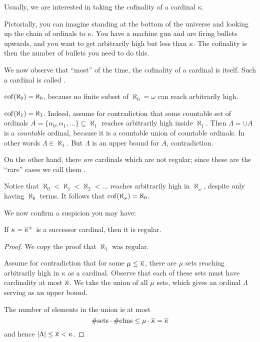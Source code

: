 Usually, we are interested in taking the cofinality of a cardinal $\kappa$.

Pictorially, you can imagine standing at the bottom of the universe and looking
up the chain of ordinals to $\kappa$.
You have a machine gun and are firing bullets upwards, and you want to get arbitrarily
high but less than $\kappa$.
The cofinality is then the number of bullets you need to do this.

We now observe that ``most'' of the time, the cofinality of a cardinal is itself.
Such a cardinal is called .
\begin{example}
	$\operatorname{cof}(\aleph_0) = \aleph_0$, because no finite subset of
	$\aleph_ 0 = \omega$ can reach arbitrarily high.
\end{example}
\begin{example}
	$\operatorname{cof}(\aleph_1) = \aleph_1$.
	Indeed, assume for contradiction that some countable
	set of ordinals $A = \{ \alpha_0, \alpha_1, \dots \} \subseteq \aleph_1$
	reaches arbitrarily high inside $\aleph_1$.
	Then $\Lambda = \cup A$ is a \emph{countable} ordinal,
	because it is a countable union of countable ordinals.
	In other words $\Lambda \in \aleph_1$.
	But $\Lambda$ is an upper bound for $A$, contradiction.
\end{example}
On the other hand, there \emph{are} cardinals which are not regular;
since these are the ``rare'' cases we call them .
\begin{example}
	Notice that $\aleph_0 < \aleph_1 < \aleph_2 < \dots$ reaches
	arbitrarily high in $\aleph_\omega$, despite only having $\aleph_0$ terms.
	It follows that $\operatorname{cof}(\aleph_\omega) = \aleph_0$.
\end{example}

We now confirm a suspicion you may have:
\begin{theorem}
	If $\kappa = \overline\kappa^+$ is a successor cardinal,
	then it is regular.
\end{theorem}
\begin{proof}
	We copy the proof that $\aleph_1$ was regular.

	Assume for contradiction that for some $\mu \le \overline\kappa$,
	there are $\mu$ sets reaching arbitrarily high in $\kappa$ as a cardinal.
	Observe that each of these sets must have cardinality at most $\overline\kappa$.
	We take the union of all $\mu$ sets, which gives an ordinal $\Lambda$
	serving as an upper bound.

	The number of elements in the union is at most
	\[ \#\text{sets} \cdot \#\text{elms}
		\le \mu \cdot \overline\kappa = \overline\kappa \]
	and hence $\left\lvert \Lambda \right\rvert \le \overline\kappa < \kappa$.
\end{proof}

